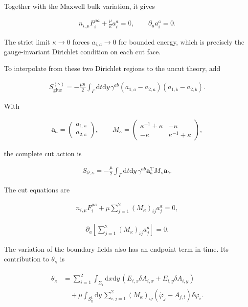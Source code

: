 Together with the Maxwell bulk variation, it gives

\begin{align}
n_{i,\mu}F_i^{\mu a}
+\frac\mu\kappa a_i^a=0,
\qquad
\partial_a a_i^a=0.
\end{align}

The strict limit $\kappa\to0$ forces $a_{i,a}\to0$ for bounded energy, which is precisely the gauge-invariant Dirichlet condition on each cut face.

To interpolate from these two Dirichlet regions to the uncut theory, add

\begin{align}
S_{\mathrm{glue}}^{(\kappa)}
=-\frac{\mu\kappa}{2}\int_\Gamma\mathrm dt\mathrm dy\,
\gamma^{ab}(a_{1,a}-a_{2,a})(a_{1,b}-a_{2,b}).
\end{align}

With

\begin{align}
\boldsymbol a_a=
\begin{pmatrix}
a_{1,a}\\
a_{2,a}
\end{pmatrix},
\qquad
M_\kappa=
\begin{pmatrix}
\kappa^{-1}+\kappa&-\kappa\\
-\kappa&\kappa^{-1}+\kappa
\end{pmatrix},
\end{align}

the complete cut action is

\begin{align}
S_{\partial,\kappa}
=-\frac\mu2\int_\Gamma\mathrm dt\mathrm dy\,
\gamma^{ab}\boldsymbol a_a^{\mathrm T}M_\kappa\boldsymbol a_b.
\end{align}

The cut equations are

\begin{align}
n_{i,\mu}F_i^{\mu a}
+\mu\sum_{j=1}^2(M_\kappa)_{ij}a_j^a=0,
\end{align}

\begin{align}
\partial_a\left[
\sum_{j=1}^2(M_\kappa)_{ij}a_j^a
\right]=0.
\end{align}

The variation of the boundary fields also has an endpoint term in time. Its contribution to $\theta_\kappa$ is

\begin{align}
\begin{aligned}
\theta_\kappa
&=\sum_{i=1}^2\int_{\Sigma_i}\mathrm dx\mathrm dy\,
(E_{i,x}\delta A_{i,x}+E_{i,y}\delta A_{i,y}) \\
&\quad+\mu\int_{S_y^1}\mathrm dy\,
\sum_{i,j=1}^2(M_\kappa)_{ij}
(\dot\varphi_j-A_{j,t})\delta\varphi_i.
\end{aligned}
\end{align}

